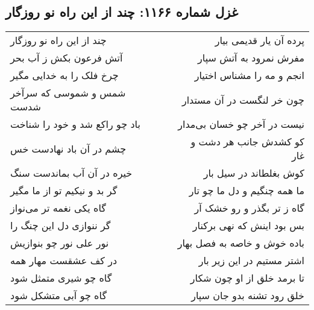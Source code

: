 \begin{center}
\section*{غزل شماره ۱۱۶۶: چند از این راه نو روزگار}
\label{sec:1166}
\begin{longtable}{l p{0.5cm} r}
چند از این راه نو روزگار
&&
پرده آن یار قدیمی بیار
\\
آتش فرعون بکش ز آب بحر
&&
مفرش نمرود به آتش سپار
\\
چرخ فلک را به خدایی مگیر
&&
انجم و مه را مشناس اختیار
\\
شمس و شموسی که سرآخر شدست
&&
چون خر لنگست در آن مستدار
\\
باد چو راکع شد و خود را شناخت
&&
نیست در آخر چو خسان بی‌مدار
\\
چشم در آن باد نهادست خس
&&
کو کشدش جانب هر دشت و غار
\\
خیره در آن آب بماندست سنگ
&&
کوش بغلطاند در سیل بار
\\
گر بد و نیکیم تو از ما مگیر
&&
ما همه چنگیم و دل ما چو تار
\\
گاه یکی نغمه تر می‌نواز
&&
گاه ز تر بگذر و رو خشک آر
\\
گر ننوازی دل این چنگ را
&&
بس بود اینش که نهی برکنار
\\
نور علی نور چو بنوازیش
&&
باده خوش و خاصه به فصل بهار
\\
در کف عشقست مهار همه
&&
اشتر مستیم در این زیر بار
\\
گاه چو شیری متمثل شود
&&
تا برمد خلق از او چون شکار
\\
گاه چو آبی متشکل شود
&&
خلق رود تشنه بدو جان سپار
\\
\end{longtable}
\end{center}
